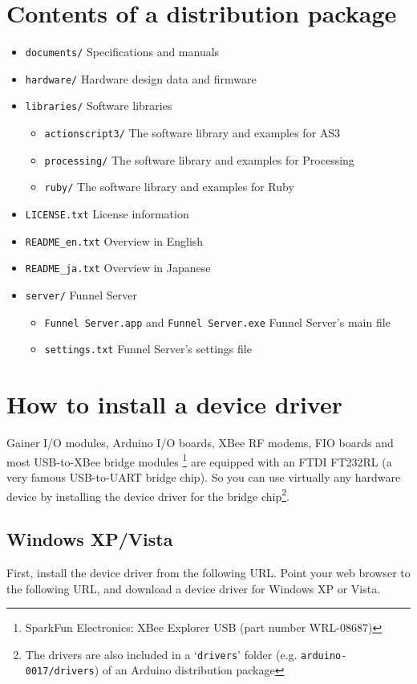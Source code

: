 \documentclass[9pt]{jsarticle}
\begin{document}
\section{Contents of a distribution package}
\begin{itemize}
\item \texttt{documents/} Specifications and manuals
\item \texttt{hardware/} Hardware design data and firmware
\item \texttt{libraries/} Software libraries
	\begin{itemize}
	\item \texttt{actionscript3/} The software library and examples for AS3
	\item \texttt{processing/} The software library and examples for Processing
	\item \texttt{ruby/} The software library and examples for Ruby
	\end{itemize}
\item \texttt{LICENSE.txt} License information
\item \texttt{README\_en.txt} Overview in English
\item \texttt{README\_ja.txt} Overview in Japanese
\item \texttt{server/} Funnel Server
	\begin{itemize}
	\item \texttt{Funnel Server.app} and \texttt{Funnel Server.exe} Funnel Server's main file
	\item \texttt{settings.txt} Funnel Server's settings file
	\end{itemize}
\end{itemize}

\section{How to install a device driver}
Gainer I/O modules, Arduino I/O boards, XBee RF modems, FIO boards and most USB-to-XBee bridge modules \footnote{SparkFun Electronics: XBee Explorer USB (part number WRL-08687)} are equipped with an FTDI FT232RL (a very famous USB-to-UART bridge chip). So you can use virtually any hardware device by installing the device driver for the bridge chip\footnote{The drivers are also included in a `\texttt{drivers}' folder  (e.g. \texttt{arduino-0017/drivers}) of an Arduino distribution package}.

\subsection{Windows XP/Vista}
First, install the device driver from the following URL. Point your web browser to the following URL, and download a device driver for Windows XP or Vista.
\end{document}
